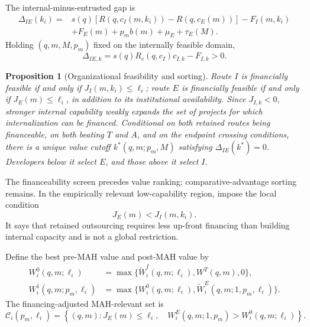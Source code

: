 \documentclass[12pt]{article}
\newtheorem{proposition}{Proposition}
\newcommand{\1}{\mathbf{1}}
\begin{document}
The internal-minus-entrusted gap is
\begin{equation}
  \begin{aligned}
  \Delta_{IE}(k_i)
  ={}&
  s(q)\!\left[
  R\!\left(q,c_I(m,k_i)\right)-R\!\left(q,c_E(m)\right)
  \right]-F_I(m,k_i)\\
  &+F_E(m)+p_mb(m)+\mu_E+\tau_E(M).
  \end{aligned}
  \label{eq:p16m-gap}
\end{equation}
Holding \((q,m,M,p_m)\) fixed on the internally feasible domain,
\[
  \Delta_{IE,k}
  =
  s(q)R_c\!\left(q,c_I\right)c_{I,k}-F_{I,k}>0.
\]
\begin{proposition}[Organizational feasibility and sorting]
\label{prop:main-finance-sorting}
Route \(I\) is financially feasible if and only if
\(J_I(m,k_i)\leq\ell_i\); route \(E\) is financially feasible if and only if
\(J_E(m)\leq\ell_i\), in addition to its institutional availability. Since
\(J_{I,k}<0\), stronger internal capability weakly expands the set of projects
for which internalization can be financed. Conditional on both retained
routes being financeable, on both beating \(T\) and \(A\), and on the endpoint
crossing conditions, there is a unique value cutoff
\(k^*(q,m;p_m,M)\) satisfying \(\Delta_{IE}(k^*)=0\). Developers below it
select \(E\), and those above it select \(I\).
\end{proposition}

The financeability screen precedes value ranking; comparative-advantage
sorting remains. In the empirically relevant low-capability region, impose
the local condition
\[
  J_E(m)<J_I(m,k_i).
\]
It says that retained outsourcing requires less up-front financing than
building internal capacity and is not a global restriction.

Define the best pre-MAH value and post-MAH value by
\begin{equation}
  \begin{aligned}
  W_i^0(q,m;\ell_i)
  &=\max\{\widetilde W_i^I(q,m;\ell_i),W^T(q,m),0\},\\
  W_i^1(q,m;p_m,\ell_i)
  &=\max\{W_i^0(q,m;\ell_i),
           \widetilde W_i^E(q,m;1,p_m,\ell_i)\}.
  \end{aligned}
  \label{eq:p16m-old-new-values}
\end{equation}
The financing-adjusted MAH-relevant set is
\begin{equation}
  \mathcal C_i(p_m,\ell_i)
  =\left\{(q,m):
  J_E(m)\leq\ell_i,\quad
  W_i^E(q,m;1,p_m)>W_i^0(q,m;\ell_i)
  \right\}.
  \label{eq:p16m-relevant-set}
\end{equation}
\end{document}
